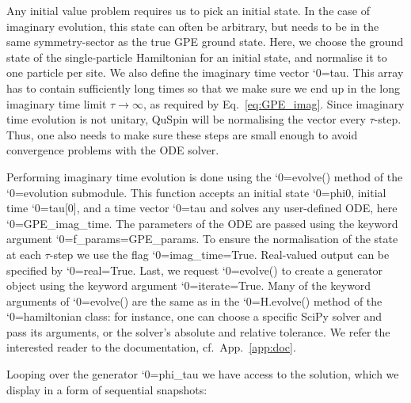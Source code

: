 \documentclass{SciPost}
\newcommand\0{\scalebox{-1}[1]{0}}
\let\svttfamily\ttfamily
\renewcommand\ttfamily{\svttfamily\catcode`0=\active }
\renewcommand\texttt{\bgroup\ttfamily\texttthelp}
\def\texttthelp#1{#1\egroup}
\newcommand{\GPcode}{example8.py}
\begin{document}

Any initial value problem requires us to pick an initial state. In the case of imaginary evolution, this state can often be arbitrary, but needs to be in the same symmetry-sector as the true GPE ground state. Here, we choose the ground state of the single-particle Hamiltonian for an initial state, and normalise it to one particle per site. We also define the imaginary time vector \texttt{tau}. This array has to contain sufficiently long times so that we make sure we end up in the long imaginary time limit $\tau\to\infty$, as required by Eq.~\eqref{eq:GPE_imag}. Since imaginary time evolution is not unitary, QuSpin will be normalising the vector every $\tau$-step. Thus, one also needs to make sure these steps are small enough to avoid convergence problems with the ODE solver.

Performing imaginary time evolution is done using the \texttt{evolve()} method of the \texttt{evolution} submodule. This function accepts an initial state \texttt{phi0}, initial time \texttt{tau[0]}, and a time vector \texttt{tau} and solves any user-defined ODE, here \texttt{GPE\_imag\_time}. The parameters of the ODE are passed using the keyword argument \texttt{f\_params=GPE\_params}. To ensure the normalisation of the state at each $\tau$-step we use the flag \texttt{imag\_time=True}. Real-valued output can be specified by \texttt{real=True}. Last, we request \texttt{evolve()} to create a generator object using the keyword argument \texttt{iterate=True}. Many of the keyword arguments of \texttt{evolve()} are the same as in the \texttt{H.evolve()} method of the \texttt{hamiltonian} class: for instance, one can choose a specific SciPy solver and pass its arguments, or the solver's absolute and relative tolerance. We refer the interested reader to the documentation, cf.~App.~\ref{app:doc}.

Looping over the generator \texttt{phi\_tau} we have access to the solution, which we display in a form of sequential snapshots:

\end{document}
